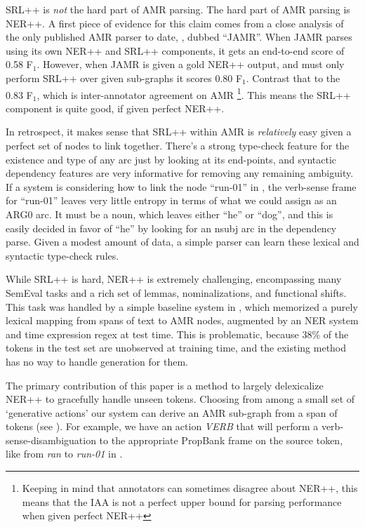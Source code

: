 \documentclass[11pt]{article}
\newcommand\w[1]{\textit{#1}} %
\newcommand\n[1]{\textit{#1}} %
\begin{document}
SRL++ is \textit{not} the hard part of AMR parsing. The hard part of AMR parsing is NER++. A first piece of evidence for this claim comes from a close analysis of the only published AMR parser to date, \cite{2014flanigan-amr}, dubbed ``JAMR''.
When JAMR parses using its own NER++ and SRL++ components, it gets an end-to-end score of 0.58 F$_1$.
However, when JAMR is given a gold NER++ output, and must only perform SRL++ over given sub-graphs it scores 0.80 F$_1$. Contrast that to the 0.83 F$_1$, which is inter-annotator agreement on AMR \cite{2013banarescu-amr}  \footnote{Keeping in mind that annotators can sometimes disagree about NER++, this means that the IAA is not a perfect upper bound for parsing performance when given perfect NER++}.
This means the SRL++ component is quite good, if given perfect NER++.

In retrospect, it makes sense that SRL++ within AMR is \textit{relatively} easy given a perfect set of nodes to link together.
There's a strong type-check feature for the existence and type of any arc just by looking at its end-points, and syntactic dependency features are very informative for removing any remaining ambiguity.
If a system is considering how to link the node ``run-01'' in , the verb-sense frame for ``run-01'' leaves very little entropy in terms of what we could assign as an ARG0 arc.
It must be a noun, which leaves either ``he'' or ``dog'', and this is easily decided in favor of ``he'' by looking for an nsubj arc in the dependency parse. Given a modest amount of data, a simple parser can learn these lexical and syntactic type-check rules.

While SRL++ is hard, NER++ is extremely challenging, encompassing many SemEval tasks and a rich set of lemmas, nominalizations, and functional shifts.
This task was handled by a simple baseline system in \cite{2014flanigan-amr}, which memorized a purely lexical mapping from spans of text to AMR nodes, augmented by an NER system and time expression regex at test time.
This is problematic, because 38\% of the tokens in the test set are unobserved at training time, and the existing method has no way to handle generation for them.

The primary contribution of this paper is a method to largely delexicalize NER++ to gracefully handle unseen tokens.
Choosing from among a small set of `generative actions' our system can derive an AMR sub-graph from a span of tokens (see ).
For example, we have an action \textit{VERB} that will perform a verb-sense-disambiguation to the appropriate PropBank frame \cite{palmer2005proposition-srl} on the source token, like from \w{ran} to \n{run-01} in .
\end{document}
